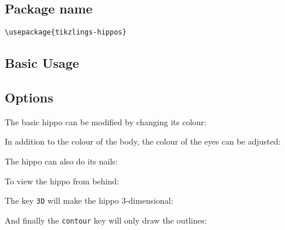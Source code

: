 \documentclass[parskip=half]{scrartcl}
\begin{document}
\subsection{Package name}

\begin{tcolorbox}[lower separated=false, lefthand width=.8\linewidth]
\vspace*{0.5cm}
\lstinline|\usepackage{tikzlings-hippos}| 
\vspace*{0.5cm}
\end{tcolorbox}

\subsection{Basic Usage}

\begin{tcblisting}{}
\hippo
\end{tcblisting}

\subsection{Options}

The basic hippo can be modified by changing its colour:
\begin{tcblisting}{}
\hippo[body=blue]
\end{tcblisting}

In addition to the colour of the body, the colour of the eyes can be adjusted:
\begin{tcblisting}{}
\hippo[eye=red]
\end{tcblisting}
\begin{tcblisting}{}
\hippo[pupil=red]
\end{tcblisting}

The hippo can also do its nails:
\begin{tcblisting}{}
\hippo[toes=red]
\end{tcblisting}

To view the hippo from behind:
\begin{tcblisting}{}
\hippo[back]
\end{tcblisting}

The key \lstinline|3D| will make the hippo 3-dimensional:
\begin{tcblisting}{}
\hippo[3D]
\end{tcblisting}

And finally the \lstinline|contour| key will only draw the outlines:
\begin{tcblisting}{}
\hippo[contour=black]
\end{tcblisting}
\end{document}
